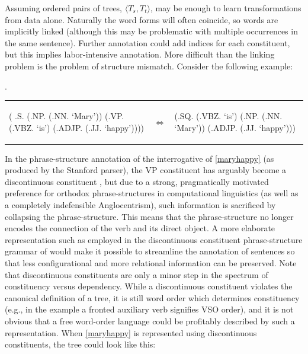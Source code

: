 \documentclass[a4paper]{article}
\theoremstyle{definition}
\begin{document}
Assuming ordered pairs of trees, $\langle T_{\mathit{s}},
T_{\mathit{t}} \rangle $, may be enough to learn transformations
from data alone. Naturally the word forms will often coincide, so words are
implicitly linked (although this may be problematic with multiple occurrences
in the same sentence). Further annotation could add indices for each
constituent, but this implies labor-intensive annotation. More difficult than
the linking problem is the problem of structure mismatch. Consider the following
example:

\ex. \label{maryhappy}

\begin{tabular}{lll}
\begin{parsetree}
   ( .S.
    (.NP. (.NN. `Mary'))
    (.VP. (.VBZ. `is')
      (.ADJP. (.JJ. `happy'))))
\end{parsetree}
& $\iff$ &
\begin{parsetree}
  (.SQ. 
    (.VBZ. `is')
    (.NP. (.NN. `Mary'))
    (.ADJP. (.JJ. `happy')))
\end{parsetree}
\end{tabular}
\vspace{1em}

In the phrase-structure annotation of the interrogative of \ref{maryhappy} (as produced
by the Stanford parser), the \textsc{VP} constituent has arguably become a
discontinuous constituent \citep{harman1963generative}, but due to a strong,
pragmatically motivated preference for orthodox phrase-structures in
computational linguistics (as well as a completely indefensible Anglocentrism),
such information is sacrificed by collapsing the phrase-structure. This means
that the phrase-structure no longer encodes the connection of the verb and its
direct object. A more elaborate representation such as employed in the
discontinuous constituent phrase-structure grammar of
\citet{harman1963generative} would make it possible to streamline the
annotation of sentences so that less configurational and more relational information can be
preserved.  Note that discontinuous constituents are only a minor step in the
spectrum of constituency versus dependency. While a discontinuous constituent
violates the canonical definition of a tree, it is still word order which
determines constituency (e.g., in the example a fronted auxiliary verb
signifies VSO order), and it is not obvious that a free word-order language
could be profitably described by such a representation.  When \ref{maryhappy}
is represented using discontinuous constituents, the tree could look like this:
\end{document}
